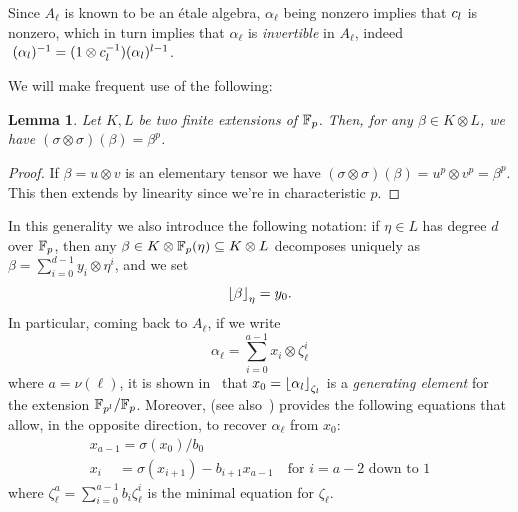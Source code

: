 \documentclass[sigconf]{acmart}
\newtheorem{lemma}[theorem]{Lemma}
\begin{document}
Since $A_\ell$ is known to be an \'etale algebra, 
$\alpha_\ell$ being nonzero implies that $c_l$ is nonzero, which in turn implies
that $\alpha_\ell$ is \emph{invertible} in $A_\ell$, indeed $\;(\alpha_l)^{-1} = (1\otimes c_l^{-1})(\alpha_l)^{l-1}$.


We will make frequent use of the following:
\begin{lemma}
\label{FrobFrob}
Let $K,L$ be two finite extensions of $\mathbb{F}_{p}$.
Then, for any $\beta\in K\otimes L$,
we have $(\sigma\otimes\sigma)(\beta)=\beta^p$.
\end{lemma}
\begin{proof}
If $\beta=u\otimes v$ is an elementary tensor we have $(\sigma\otimes\sigma)(\beta)=u^p\otimes v^p=\beta^p$.
This then extends by linearity since we're in characteristic $p$. 
\end{proof}
In this generality we also introduce the following notation: if $\eta\in L$ has degree $d$ over $\mathbb{F}_{p}$,
then any $\beta\in K\otimes\mathbb{F}_{p}(\eta)\subseteq K\otimes L$ decomposes uniquely as $\beta = \sum_{i =  0}^{d-1}y_i\otimes\eta^i$,
and we set  \[ \left\lfloor \beta \right\rfloor_{\eta}=y_0. \]
In particular, coming back to $A_\ell$, if we write
\[ \alpha_\ell = \sum_{i=0}^{a-1}x_i\otimes\zeta_{\ell}^i \] where $a=\nu(\ell)$,
it is shown in~\cite{Allombert02} that $x_0=\left\lfloor \alpha_l \right\rfloor_{\zeta_l}$ is a \emph{generating element} for the extension
$\mathbb{F}_{p^l}/\mathbb{F}_{p}$.
Moreover, \cite{Allombert02} (see also~\cite{brieulle2018computing}) provides the following equations
that allow, in the opposite direction, to recover $\alpha_\ell$ from $x_0$:
\begin{equation}
\label{recoveralpha}
\begin{array}{l}
x_{a-1}=\sigma(x_0)/b_0\\
x_{i}\quad\,=\sigma(x_{i+1})-b_{i+1}x_{a-1}\quad\text{for $i=a\!-\!2$ down to $1$}
\end{array}
\end{equation}
where $\zeta_\ell^a=\sum_{i=0}^{a-1}b_i\zeta_\ell^i$ is the minimal equation for $\zeta_\ell$.
\end{document}
